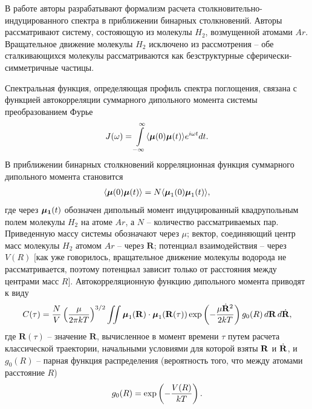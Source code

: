 В работе \cite{kranendonk1973} авторы разрабатывают формализм расчета столкновительно-индуцированного спектра в приближении бинарных столкновений. Авторы рассматривают систему, состояющую из молекулы $H_2$, возмущенной атомами $Ar$. Вращательное движение молекулы $H_2$ исключено из рассмотрения -- обе сталкивающихся молекулы рассматриваются как безструктурные сферически-симметричные частицы. \par
    Спектральная функция, определяющая профиль спектра поглощения, связана с функцией автокорреляции суммарного дипольного момента системы преобразованием Фурье
\begin{gather}
    J(\omega) = \int\limits_{-\infty}^\infty \langle  \boldsymbol{\mu}(0) \boldsymbol{\mu}(t)  \rangle e^{i \omega t} dt. \label{twoatom-spectral-function}
\end{gather} 
В приближении бинарных столкновений корреляционная функция суммарного дипольного момента становится 
\begin{gather}
    \langle  \boldsymbol{\mu}(0) \boldsymbol{\mu}(t)  \rangle = N \langle  \boldsymbol{\mu}_1(0) \boldsymbol{\mu}_1(t)  \rangle,
\end{gather} 
%
где через $\boldsymbol{\mu_1}(t)$ обозначен дипольный момент индуцированный квадрупольным полем молекулы $H_2$ на атоме $Ar$, а $N$ -- количество рассматриваемых пар. Приведенную массу системы обозначают через $\mu$; вектор, соединяющий центр масс молекулы $H_2$ атомом $Ar$ -- через $\mathbf{R}$; потенциал взаимодействия -- через $V(R)$ $[$как уже говорилось, вращательное движение молекулы водорода не рассматривается, поэтому потенциал зависит только от расстояния между центрами масс $R$$]$. Автокорреляционную функцию дипольного момента приводят к виду 
\begin{gather}
    C(\tau) = \frac{N}{V} \left( \frac{\mu}{2 \pi k T} \right)^{3/2} \iint \boldsymbol{\mu}_1(\mathbf{R}) \cdot \boldsymbol{\mu}_1(\mathbf{R}(\tau)) \exp \left( -\frac{\mu \dot{\mathbf{R}}^2}{2 k T} \right) g_0(R) \, d \mathbf{R} \, d \dot{\mathbf{R}}, \label{kranendonk-correlation-function}
\end{gather}
%
где $\mathbf{R}(\tau)$ -- значение $\mathbf{R}$, вычисленное в момент времени $\tau$ путем расчета классической траектории, начальными условиями для которой взяты $\mathbf{R}$ и $\dot{\mathbf{R}}$, и $g_0(R)$ -- парная функция распределения (вероятность того, что между атомами расстояние $R$)
\begin{gather}
    g_0(R) = \exp \left( -\frac{V(R)}{kT} \right).
\end{gather}

